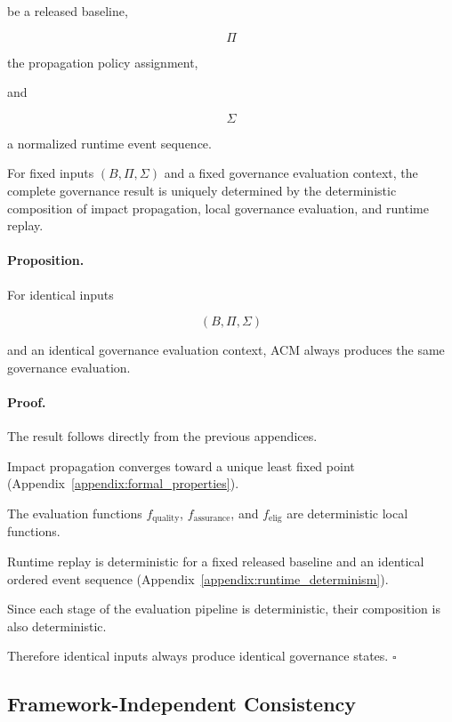 \documentclass[10pt]{article}
\begin{document}
be a released baseline,

\[
\Pi
\]

the propagation policy assignment,

and

\[
\Sigma
\]

a normalized runtime event sequence.

For fixed inputs $(B,\Pi,\Sigma)$ and a fixed governance evaluation context, the
complete governance result is uniquely determined by the deterministic
composition of impact propagation, local governance evaluation, and runtime
replay.

\paragraph*{Proposition.}

For identical inputs

\[
(B,\Pi,\Sigma)
\]

and an identical governance evaluation context, ACM always produces the same
governance evaluation.

\paragraph*{Proof.}

The result follows directly from the previous appendices.

Impact propagation converges toward a unique least fixed point
(Appendix~\ref{appendix:formal_properties}).

The evaluation functions
$f_{\mathrm{quality}}$,
$f_{\mathrm{assurance}}$,
and
$f_{\mathrm{elig}}$
are deterministic local functions.

Runtime replay is deterministic for a fixed released baseline and an identical ordered event sequence (Appendix~\ref{appendix:runtime_determinism}).

Since each stage of the evaluation pipeline is deterministic, their composition is also deterministic.

Therefore identical inputs always produce identical governance states.
\hfill$\square$

\subsection{Framework-Independent Consistency}
\label{appendix:framework_independent_consistency}
\end{document}

